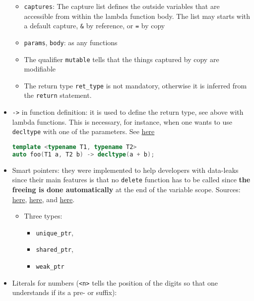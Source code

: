 \documentclass[a4paper,12pt,%
              final%
              ]{article}
\begin{document}
\begin{itemize}
    \begin{itemize}
      \item \verb|captures|: The capture list defines the outside variables that are accessible from within the lambda function body. The list may starts with a default capture, \verb|&| by reference, or \verb|=| by copy
      \item \verb|params|, \verb|body|: as any functions
      \item The qualifier \texttt{mutable} tells that the things captured by copy are modifiable
      \item The return type \verb|ret_type| is not mandatory, otherwise it is inferred from the \texttt{return} statement.
    \end{itemize}
  \item \texttt{->} in function definition: it is used to define the return type, see above with lambda functions. This is necessary, for instance, when one wants to use \texttt{decltype} with one of the parameters. See \href{https://stackoverflow.com/a/22515589/12152457}{here}
    \begin{lstlisting}[language=C++]
template <typename T1, typename T2>
auto foo(T1 a, T2 b) -> decltype(a + b);
    \end{lstlisting}
  \item Smart pointers: they were implemented to help developers with data-leaks since their main features is that no \texttt{delete} function has to be called since \textbf{the freeing is done automatically} at the end of the variable scope. Sources: \href{https://www.geeksforgeeks.org/smart-pointers-cpp/}{here}, \href{https://www.internalpointers.com/post/beginner-s-look-smart-pointers-modern-c}{here}, and \href{https://docs.microsoft.com/en-us/cpp/cpp/smart-pointers-modern-cpp?view=msvc-170}{here}.
      \begin{itemize}
        \item Three types:
          \begin{itemize}
            \item \verb|unique_ptr|,
            \item \verb|shared_ptr|,
            \item \verb|weak_ptr|
          \end{itemize}
      \end{itemize}
  \item Literals for numbers (\texttt{<n>} tells the position of the digits so that one understands if its a pre- or suffix):
    \begin{itemize}

\end{itemize}
\end{itemize}
\end{document}
